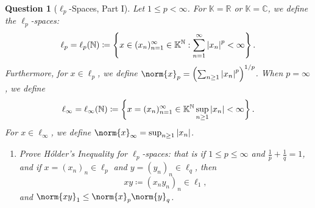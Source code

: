 \documentclass[notoc,notitlepage]{tufte-book}
\newtheorem{assgprob}{Question}[section]
\begin{document}
\begin{assgprob}[$\ell_p$-Spaces, Part I]
  Let $1 \leq p < \infty$.
  For $\mathbb{K} = \mathbb{R}$ or $\mathbb{K} = \mathbb{C}$, we define
  the $\ell_p$-spaces:
  \begin{equation*}
    \ell_p = \ell_p(\mathbb{N})
    \coloneqq \left\{ x \in (x_n)_{n=1}^{\infty} \in \mathbb{K}^{\mathbb{N}} :
      \sum_{n=1}^{\infty} \left|x_n\right|^{p} < \infty \right\}.
  \end{equation*}
  Furthermore, for $x \in \ell_p$, we define $\norm{x}_p = \left( \sum_{n \geq
  1} \abs{x_n}^p \right)^{1 / p}$.
  When $p = \infty$, we define
  \begin{equation*}
    \ell_\infty = \ell_\infty(\mathbb{N})
    \coloneqq \left\{ x = (x_n)_{n=1}^{\infty} \in \mathbb{K}^{\mathbb{N}}
      \sup_{n \geq 1} \left|x_n\right| < \infty \right\}.
  \end{equation*}
  For $x \in \ell_\infty$, we define $\norm{x}_{\infty} = \sup_{n \geq 1}
  \abs{x_n}$.

  \begin{enumerate}
    \item Prove Hólder's Inequality for $\ell_p$-spaces:
      that is if $1 \leq p \leq \infty$ and $\frac{1}{p} + \frac{1}{q} = 1$,
      and if $x = (x_n)_n \in \ell_p$ and $y = (y_n)_n \in \ell_q$,
      then
      \begin{equation*}
        xy \coloneqq (x_n y_n)_n \in \ell_1,
      \end{equation*}
      and $\norm{xy}_1 \leq \norm{x}_p \norm{y}_q$.
  \end{enumerate}
\end{assgprob}



\backmatter

\fancyhead[LE]{\thepage \enspace \textsl{\leftmark}}



\printindex
\end{document}
